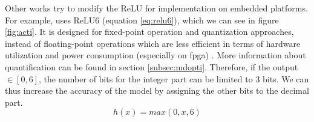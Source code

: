 Other works try to modify the ReLU for implementation on embedded platforms. For example, \cite{howard_mobilenets_2017} uses ReLU6 (equation \ref{eq:relu6}), which we can see in figure \ref{fig:acti}. It is designed for fixed-point operation and quantization approaches, instead of floating-point operations which are less efficient in terms of hardware utilization and power consumption (especially on \acrshort{fpga}) \cite{david_hardware_2007}. More information about quantification can be found in section \ref{subsec:mdopti}. Therefore, if the output $\in [ 0, 6 ]$, the number of bits for the integer part can be limited to 3 bits. We can thus increase the accuracy of the model by assigning the other bits to the decimal part.
%
\begin{equation}
    h(x) = max(0, x, 6)
    \label{eq:relu6}
\end{equation}
